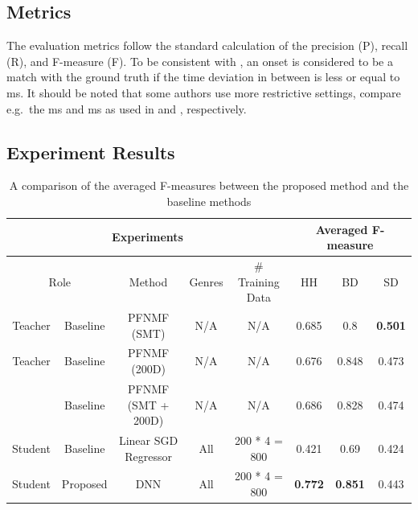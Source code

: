 \documentclass{article}
\begin{document}
\subsection{Metrics}
The evaluation metrics follow the standard calculation of the precision (P), recall (R), and F-measure (F). To be consistent with \cite{Gillet2008, Wu2015a, Southall2016}, an onset is considered to be a match with the ground truth if the time deviation in between is less or equal to \unit[50]{ms}. It should be noted that some authors use more restrictive settings, compare e.g.\ the \unit[30]{ms} and \unit[20]{ms} as used in \cite{Paulus2009a} and \cite{Vogl2017}, respectively.  

\subsection{Experiment Results}
\begin{table}[]
\centering
\begin{tabular}{cccccccc}
\hline
\multicolumn{5}{c}{Experiments}                                                & \multicolumn{3}{c}{Averaged F-measure}           \\ \hline
\multicolumn{2}{c}{Role} & Method                  & Genres & \# Training Data & HH             & BD             & SD             \\ \hline
Teacher    & Baseline    & PFNMF (SMT)             & N/A    & N/A              & 0.685          & 0.8            & \textbf{0.501} \\
Teacher    & Baseline    & PFNMF (200D)       & N/A    & N/A              & 0.676          & 0.848          & 0.473          \\
           & Baseline    & PFNMF (SMT + 200D) & N/A    & N/A              & 0.686          & 0.828          & 0.474          \\
Student    & Baseline    & Linear SGD Regressor    & All    & 200 * 4 = 800    & 0.421          & 0.69           & 0.424          \\
Student    & Proposed    & DNN                     & All    & 200 * 4 = 800    & \textbf{0.772} & \textbf{0.851} & 0.443          \\ \hline
\end{tabular}
\caption{A comparison of the averaged F-measures between the proposed method and the baseline methods}
\label{tab:all_results}
\end{table}
\end{document}
